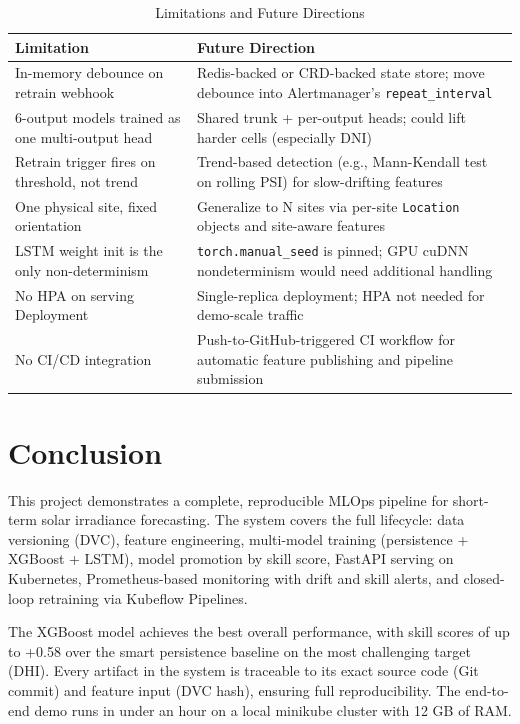 \documentclass[11pt,a4paper]{article}
\begin{document}
\begin{table}[H]
\centering
\small
\begin{tabular}{@{}p{4cm}p{8cm}@{}}
\toprule
\textbf{Limitation} & \textbf{Future Direction} \\
\midrule
In-memory debounce on retrain webhook & Redis-backed or CRD-backed state store; move debounce into Alertmanager's \texttt{repeat\_interval} \\
\midrule
6-output models trained as one multi-output head & Shared trunk + per-output heads; could lift harder cells (especially DNI) \\
\midrule
Retrain trigger fires on threshold, not trend & Trend-based detection (e.g., Mann-Kendall test on rolling PSI) for slow-drifting features \\
\midrule
One physical site, fixed orientation & Generalize to N sites via per-site \texttt{Location} objects and site-aware features \\
\midrule
LSTM weight init is the only non-determinism & \texttt{torch.manual\_seed} is pinned; GPU cuDNN nondeterminism would need additional handling \\
\midrule
No HPA on serving Deployment & Single-replica deployment; HPA not needed for demo-scale traffic \\
\midrule
No CI/CD integration & Push-to-GitHub-triggered CI workflow for automatic feature publishing and pipeline submission \\
\bottomrule
\end{tabular}
\caption{Limitations and Future Directions}
\label{tab:limitations}
\end{table}

\section{Conclusion}

This project demonstrates a complete, reproducible MLOps pipeline for short-term solar irradiance forecasting. The system covers the full lifecycle: data versioning (DVC), feature engineering, multi-model training (persistence + XGBoost + LSTM), model promotion by skill score, FastAPI serving on Kubernetes, Prometheus-based monitoring with drift and skill alerts, and closed-loop retraining via Kubeflow Pipelines.

The XGBoost model achieves the best overall performance, with skill scores of up to +0.58 over the smart persistence baseline on the most challenging target (DHI). Every artifact in the system is traceable to its exact source code (Git commit) and feature input (DVC hash), ensuring full reproducibility. The end-to-end demo runs in under an hour on a local minikube cluster with 12 GB of RAM.
\end{document}
